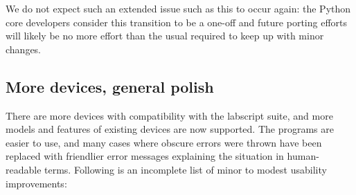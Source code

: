 We do not expect such an extended issue such as this to occur again: the Python core developers consider this transition to be a one-off and future porting efforts will likely be no more effort than the usual required to keep up with minor changes.

\subsection{More devices, general polish}

There are more devices with compatibility with the labscript suite, and more models and features of existing devices are now supported. The programs are easier to use, and many cases where obscure errors were thrown have been replaced with friendlier error messages explaining the situation in human-readable terms. Following is an incomplete list of minor to modest usability improvements:

